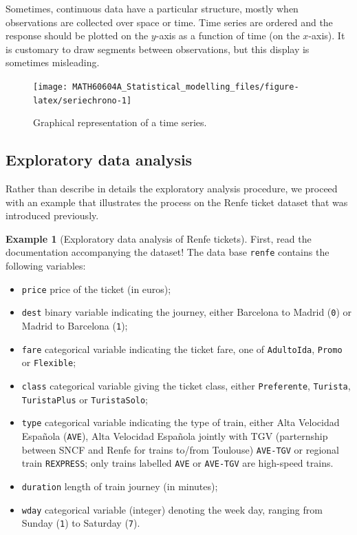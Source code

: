 \documentclass[
  11pt,
  letterpaper,
]{book}
\providecommand{\tightlist}{%
  \setlength{\itemsep}{0pt}\setlength{\parskip}{0pt}}
\theoremstyle{definition}
\theoremstyle{definition}
\newtheorem{example}{Example}[chapter]
\theoremstyle{definition}
\theoremstyle{remark}
\begin{document}
Sometimes, continuous data have a particular structure, mostly when observations are collected over space or time. Time series are ordered and the response should be plotted on the \(y\)-axis as a function of time (on the \(x\)-axis). It is customary to draw segments between observations, but this display is sometimes misleading.

\begin{figure}

{\centering \texttt{[image: MATH60604A\_Statistical\_modelling\_files/figure-latex/seriechrono-1]} 

}

\caption{Graphical representation of a time series.}\label{fig:seriechrono}
\end{figure}

\hypertarget{exploratory-data-analysis}{%
\subsection{Exploratory data analysis}\label{exploratory-data-analysis}}

Rather than describe in details the exploratory analysis procedure, we proceed with an example that illustrates the process on the Renfe ticket dataset that was introduced previously.

\begin{example}[Exploratory data analysis of Renfe tickets]
\protect\hypertarget{exm:renfe-aed}{}{\label{exm:renfe-aed} {} }First, read the documentation accompanying the dataset! The data base \texttt{renfe} contains the following variables:
\end{example}

\begin{itemize}
\tightlist
\item
  \texttt{price} price of the ticket (in euros);
\item
  \texttt{dest} binary variable indicating the journey, either Barcelona to Madrid (\texttt{0}) or Madrid to Barcelona (\texttt{1});
\item
  \texttt{fare} categorical variable indicating the ticket fare, one of \texttt{AdultoIda}, \texttt{Promo} or \texttt{Flexible};
\item
  \texttt{class} categorical variable giving the ticket class, either \texttt{Preferente}, \texttt{Turista}, \texttt{TuristaPlus} or \texttt{TuristaSolo};
\item
  \texttt{type} categorical variable indicating the type of train, either Alta Velocidad Española (\texttt{AVE}), Alta Velocidad Española jointly with TGV (parternship between SNCF and Renfe for trains to/from Toulouse) \texttt{AVE-TGV} or regional train \texttt{REXPRESS}; only trains labelled \texttt{AVE} or \texttt{AVE-TGV} are high-speed trains.
\item
  \texttt{duration} length of train journey (in minutes);
\item
  \texttt{wday} categorical variable (integer) denoting the week day, ranging from Sunday (\texttt{1}) to Saturday (\texttt{7}).
\end{itemize}
\end{document}
